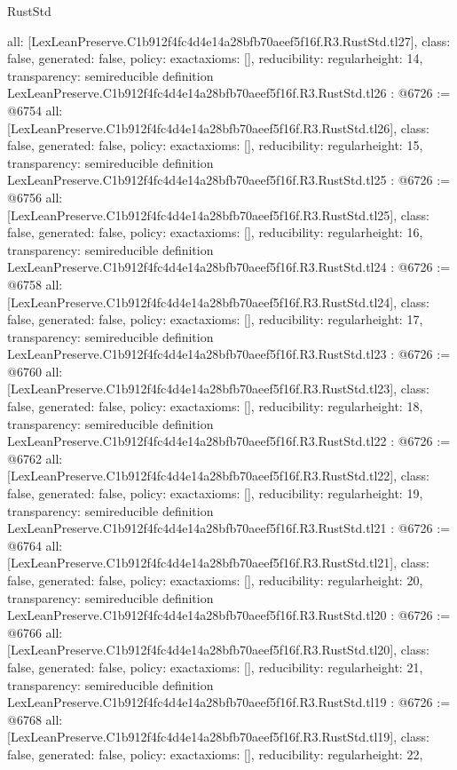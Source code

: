 \begin{lexlean}{RustStd}
\begin{coremodule}
{  all: [LexLeanPreserve.C1b912f4fc4d4e14a28bfb70aeef5f16f.R3.RustStd.tl27],
  class: false,
  generated: false,
  policy: exact{axioms: []},
  reducibility: regular{height: 14},
  transparency: semireducible
}
definition LexLeanPreserve.C1b912f4fc4d4e14a28bfb70aeef5f16f.R3.RustStd.tl26 : @6726 := @6754 {
  all: [LexLeanPreserve.C1b912f4fc4d4e14a28bfb70aeef5f16f.R3.RustStd.tl26],
  class: false,
  generated: false,
  policy: exact{axioms: []},
  reducibility: regular{height: 15},
  transparency: semireducible
}
definition LexLeanPreserve.C1b912f4fc4d4e14a28bfb70aeef5f16f.R3.RustStd.tl25 : @6726 := @6756 {
  all: [LexLeanPreserve.C1b912f4fc4d4e14a28bfb70aeef5f16f.R3.RustStd.tl25],
  class: false,
  generated: false,
  policy: exact{axioms: []},
  reducibility: regular{height: 16},
  transparency: semireducible
}
definition LexLeanPreserve.C1b912f4fc4d4e14a28bfb70aeef5f16f.R3.RustStd.tl24 : @6726 := @6758 {
  all: [LexLeanPreserve.C1b912f4fc4d4e14a28bfb70aeef5f16f.R3.RustStd.tl24],
  class: false,
  generated: false,
  policy: exact{axioms: []},
  reducibility: regular{height: 17},
  transparency: semireducible
}
definition LexLeanPreserve.C1b912f4fc4d4e14a28bfb70aeef5f16f.R3.RustStd.tl23 : @6726 := @6760 {
  all: [LexLeanPreserve.C1b912f4fc4d4e14a28bfb70aeef5f16f.R3.RustStd.tl23],
  class: false,
  generated: false,
  policy: exact{axioms: []},
  reducibility: regular{height: 18},
  transparency: semireducible
}
definition LexLeanPreserve.C1b912f4fc4d4e14a28bfb70aeef5f16f.R3.RustStd.tl22 : @6726 := @6762 {
  all: [LexLeanPreserve.C1b912f4fc4d4e14a28bfb70aeef5f16f.R3.RustStd.tl22],
  class: false,
  generated: false,
  policy: exact{axioms: []},
  reducibility: regular{height: 19},
  transparency: semireducible
}
definition LexLeanPreserve.C1b912f4fc4d4e14a28bfb70aeef5f16f.R3.RustStd.tl21 : @6726 := @6764 {
  all: [LexLeanPreserve.C1b912f4fc4d4e14a28bfb70aeef5f16f.R3.RustStd.tl21],
  class: false,
  generated: false,
  policy: exact{axioms: []},
  reducibility: regular{height: 20},
  transparency: semireducible
}
definition LexLeanPreserve.C1b912f4fc4d4e14a28bfb70aeef5f16f.R3.RustStd.tl20 : @6726 := @6766 {
  all: [LexLeanPreserve.C1b912f4fc4d4e14a28bfb70aeef5f16f.R3.RustStd.tl20],
  class: false,
  generated: false,
  policy: exact{axioms: []},
  reducibility: regular{height: 21},
  transparency: semireducible
}
definition LexLeanPreserve.C1b912f4fc4d4e14a28bfb70aeef5f16f.R3.RustStd.tl19 : @6726 := @6768 {
  all: [LexLeanPreserve.C1b912f4fc4d4e14a28bfb70aeef5f16f.R3.RustStd.tl19],
  class: false,
  generated: false,
  policy: exact{axioms: []},
  reducibility: regular{height: 22},
}
\end{coremodule}
\end{lexlean}
